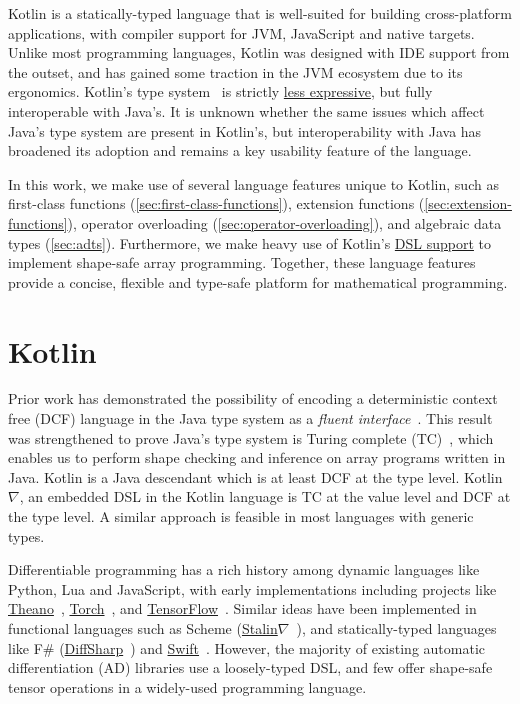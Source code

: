 Kotlin is a statically-typed language that is well-suited for building cross-platform applications, with compiler support for JVM, JavaScript and native targets. Unlike most programming languages, Kotlin was designed with IDE support from the outset, and has gained some traction in the JVM ecosystem due to its ergonomics. Kotlin's type system~\citep{tate2013mixed} is strictly \href{https://kotlinlang.org/docs/reference/generics.html#variance}{less expressive}, but fully interoperable with Java's. It is unknown whether the same issues which affect Java's type system are present in Kotlin's, but interoperability with Java has broadened its adoption and remains a key usability feature of the language.

In this work, we make use of several language features unique to Kotlin, such as first-class functions (\autoref{sec:first-class-functions}), extension functions (\autoref{sec:extension-functions}), operator overloading (\autoref{sec:operator-overloading}), and algebraic data types (\autoref{sec:adts}). Furthermore, we make heavy use of Kotlin's \href{https://kotlinlang.org/docs/reference/type-safe-builders.html}{DSL support} to implement shape-safe array programming. Together, these language features provide a concise, flexible and type-safe platform for mathematical programming.

\section{Kotlin\textorpdfstring{$\nabla$}}\label{sec:kotlingrad}

Prior work has demonstrated the possibility of encoding a deterministic context free (DCF) language in the Java type system as a \textit{fluent interface}~\citep{gil2016formal, nakamaru2017silverchain}. This result was strengthened to prove Java's type system is Turing complete (TC)~\citep{grigore2017java}, which enables us to perform shape checking and inference on array programs written in Java. Kotlin is a Java descendant which is at least DCF at the type level. Kotlin$\nabla$, an embedded DSL in the Kotlin language is TC at the value level and DCF at the type level. A similar approach is feasible in most languages with generic types.

Differentiable programming has a rich history among dynamic languages like Python, Lua and JavaScript, with early implementations including projects like \href{http://deeplearning.net/software/theano/}{Theano}~\citep{bergstra2010theano}, \href{http://torch.ch/}{Torch}~\citep{collobert2002torch}, and \href{https://tensorflow.org/}{TensorFlow}~\citep{abadi2016tensorflow}. Similar ideas have been implemented in functional languages such as Scheme (\href{https://github.com/Functional-AutoDiff/STALINGRAD}{Stalin$\nabla$}~\citep{pearlmutter2008using}), and statically-typed languages like F\# (\href{https://diffsharp.github.io/DiffSharp/}{DiffSharp}~\citep{baydin2015diffsharp}) and \href{https://www.tensorflow.org/swift}{Swift}~\citep{lattner2018tensorflow}. However, the majority of existing automatic differentiation (AD) libraries use a loosely-typed DSL, and few offer shape-safe tensor operations in a widely-used programming language.


